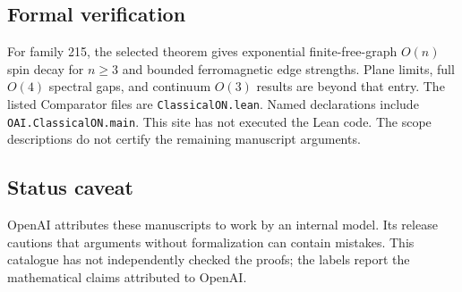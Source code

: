 \documentclass[11pt]{article}
\begin{document}
\subsection{Formal verification}
For family 215, the selected theorem gives exponential finite-free-graph $O(n)$ spin decay for $n\geq3$ and bounded ferromagnetic edge strengths. Plane limits, full $O(4)$ spectral gaps, and continuum $O(3)$ results are beyond that entry. The listed Comparator files are \texttt{ClassicalON.lean}. Named declarations include \texttt{OAI.ClassicalON.main}. This site has not executed the Lean code. The scope descriptions do not certify the remaining manuscript arguments.

\subsection{Status caveat}
OpenAI attributes these manuscripts to work by an internal model. Its release cautions that arguments without formalization can contain mistakes. This catalogue has not independently checked the proofs; the labels report the mathematical claims attributed to OpenAI.
\end{document}
